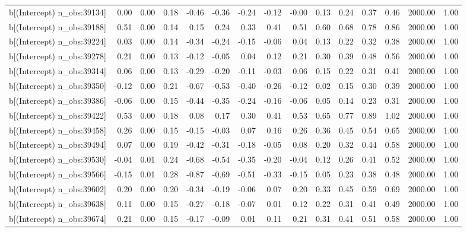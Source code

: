 \begin{table}[ht]
\begin{tabular}{rrrrrrrrrrrrrrr}
  b[(Intercept) n\_obs:39134] & 0.00 & 0.00 & 0.18 & -0.46 & -0.36 & -0.24 & -0.12 & -0.00 & 0.13 & 0.24 & 0.37 & 0.46 & 2000.00 & 1.00 \\ 
  b[(Intercept) n\_obs:39188] & 0.51 & 0.00 & 0.14 & 0.15 & 0.24 & 0.33 & 0.41 & 0.51 & 0.60 & 0.68 & 0.78 & 0.86 & 2000.00 & 1.00 \\ 
  b[(Intercept) n\_obs:39224] & 0.03 & 0.00 & 0.14 & -0.34 & -0.24 & -0.15 & -0.06 & 0.04 & 0.13 & 0.22 & 0.32 & 0.38 & 2000.00 & 1.00 \\ 
  b[(Intercept) n\_obs:39278] & 0.21 & 0.00 & 0.13 & -0.12 & -0.05 & 0.04 & 0.12 & 0.21 & 0.30 & 0.39 & 0.48 & 0.56 & 2000.00 & 1.00 \\ 
  b[(Intercept) n\_obs:39314] & 0.06 & 0.00 & 0.13 & -0.29 & -0.20 & -0.11 & -0.03 & 0.06 & 0.15 & 0.22 & 0.31 & 0.41 & 2000.00 & 1.00 \\ 
  b[(Intercept) n\_obs:39350] & -0.12 & 0.00 & 0.21 & -0.67 & -0.53 & -0.40 & -0.26 & -0.12 & 0.02 & 0.15 & 0.30 & 0.39 & 2000.00 & 1.00 \\ 
  b[(Intercept) n\_obs:39386] & -0.06 & 0.00 & 0.15 & -0.44 & -0.35 & -0.24 & -0.16 & -0.06 & 0.05 & 0.14 & 0.23 & 0.31 & 2000.00 & 1.00 \\ 
  b[(Intercept) n\_obs:39422] & 0.53 & 0.00 & 0.18 & 0.08 & 0.17 & 0.30 & 0.41 & 0.53 & 0.65 & 0.77 & 0.89 & 1.02 & 2000.00 & 1.00 \\ 
  b[(Intercept) n\_obs:39458] & 0.26 & 0.00 & 0.15 & -0.15 & -0.03 & 0.07 & 0.16 & 0.26 & 0.36 & 0.45 & 0.54 & 0.65 & 2000.00 & 1.00 \\ 
  b[(Intercept) n\_obs:39494] & 0.07 & 0.00 & 0.19 & -0.42 & -0.31 & -0.18 & -0.05 & 0.08 & 0.20 & 0.32 & 0.44 & 0.58 & 2000.00 & 1.00 \\ 
  b[(Intercept) n\_obs:39530] & -0.04 & 0.01 & 0.24 & -0.68 & -0.54 & -0.35 & -0.20 & -0.04 & 0.12 & 0.26 & 0.41 & 0.52 & 2000.00 & 1.00 \\ 
  b[(Intercept) n\_obs:39566] & -0.15 & 0.01 & 0.28 & -0.87 & -0.69 & -0.51 & -0.33 & -0.15 & 0.05 & 0.23 & 0.38 & 0.48 & 2000.00 & 1.00 \\ 
  b[(Intercept) n\_obs:39602] & 0.20 & 0.00 & 0.20 & -0.34 & -0.19 & -0.06 & 0.07 & 0.20 & 0.33 & 0.45 & 0.59 & 0.69 & 2000.00 & 1.00 \\ 
  b[(Intercept) n\_obs:39638] & 0.11 & 0.00 & 0.15 & -0.27 & -0.18 & -0.07 & 0.01 & 0.12 & 0.22 & 0.31 & 0.41 & 0.49 & 2000.00 & 1.00 \\ 
  b[(Intercept) n\_obs:39674] & 0.21 & 0.00 & 0.15 & -0.17 & -0.09 & 0.01 & 0.11 & 0.21 & 0.31 & 0.41 & 0.51 & 0.58 & 2000.00 & 1.00 \\ 

\end{tabular}
\end{table}
